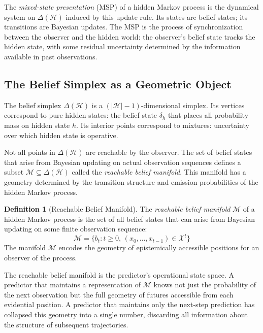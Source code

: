 \documentclass[12pt, a4paper]{article}
\theoremstyle{plain}
\theoremstyle{definition}
\newtheorem{definition}[theorem]{Definition}
\theoremstyle{remark}
\begin{document}
The \emph{mixed-state presentation} (MSP) \citep{shai2025,shalizi2001}
of a hidden Markov process is the dynamical system on $\Delta(\mathcal{H})$
induced by this update rule. Its states are belief states; its transitions
are Bayesian updates. The MSP is the process of synchronization between
the observer and the hidden world: the observer's belief state tracks the
hidden state, with some residual uncertainty determined by the information
available in past observations.

\subsection{The Belief Simplex as a Geometric Object}

The belief simplex $\Delta(\mathcal{H})$ is a $(|\mathcal{H}|-1)$-dimensional
simplex. Its vertices correspond to pure hidden states: the belief state
$\delta_h$ that places all probability mass on hidden state $h$. Its interior
points correspond to mixtures: uncertainty over which hidden state is
operative.

Not all points in $\Delta(\mathcal{H})$ are reachable by the observer.
The set of belief states that arise from Bayesian updating on actual
observation sequences defines a subset $\mathcal{M} \subseteq \Delta(\mathcal{H})$
called the \emph{reachable belief manifold}. This manifold has a geometry
determined by the transition structure and emission probabilities of the
hidden Markov process.

\begin{definition}[Reachable Belief Manifold]
The \emph{reachable belief manifold} $\mathcal{M}$ of a hidden Markov process
is the set of all belief states that can arise from Bayesian updating on
some finite observation sequence:
$$\mathcal{M} = \{b_t : t \geq 0, \, (x_0, \ldots, x_{t-1}) \in \mathcal{X}^t\}$$
The manifold $\mathcal{M}$ encodes the geometry of epistemically accessible
positions for an observer of the process.
\end{definition}

The reachable belief manifold is the predictor's operational state space.
A predictor that maintains a representation of $\mathcal{M}$ knows not just
the probability of the next observation but the full geometry of futures
accessible from each evidential position. A predictor that maintains only
the next-step prediction has collapsed this geometry into a single number,
discarding all information about the structure of subsequent trajectories.
\end{document}
